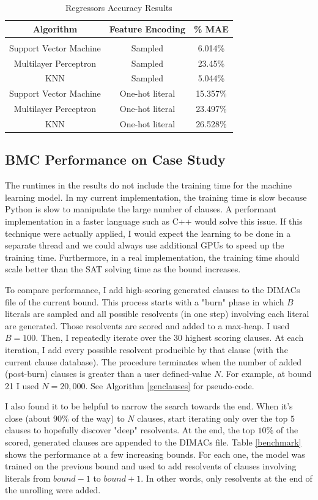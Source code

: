 \documentclass[letterpaper]{article} %
\begin{document}
\begin{table}[h!]
\centering
\begin{tabular}{ c | c | c }
Algorithm & Feature Encoding & \% MAE \\
\hline \\
Support Vector Machine & Sampled & 6.014\% \\
Multilayer Perceptron & Sampled & 23.45\% \\
KNN & Sampled & 5.044\% \\ 
Support Vector Machine & One-hot literal & 15.357\% \\
Multilayer Perceptron & One-hot literal & 23.497\% \\
KNN & One-hot literal & 26.528\% 
\end{tabular}
\caption{Regressors Accuracy Results}
\label{acc-reg}
\end{table}

\subsection{BMC Performance on Case Study}

The runtimes in the results do not include the training time for the machine learning model. In my current implementation, the training time is slow because Python is slow to manipulate the large number of clauses. A performant implementation in a faster language such as C++ would solve this issue. If this technique were actually applied, I would expect the learning to be done in a separate thread and we could always use additional GPUs to speed up the training time. Furthermore, in a real implementation, the training time should scale better than the SAT solving time as the bound increases.

To compare performance, I add high-scoring generated clauses to the DIMACs file of the current bound. This process starts with a "burn" phase in which $B$ literals are sampled and all possible resolvents (in one step) involving each literal are generated. Those resolvents are scored and added to a max-heap. I used $B=100$. Then, I repeatedly iterate over the $30$ highest scoring clauses. At each iteration, I add every possible resolvent producible by that clause (with the current clause database). The procedure terminates when the number of added (post-burn) clauses is greater than a user defined-value $N$. For example, at bound 21 I used $N=20,000$. See Algorithm \ref{genclauses} for pseudo-code.

I also found it to be helpful to narrow the search towards the end. When it's close (about 90\% of the way) to $N$ clauses, start iterating only over the top $5$ clauses to hopefully discover "deep" resolvents. At the end, the top $10\%$ of the scored, generated clauses are appended to the DIMACs file. Table \ref{benchmark} shows the performance at a few increasing bounds. For each one, the model was trained on the previous bound and used to add resolvents of clauses involving literals from $bound-1$ to $bound+1$. In other words, only resolvents at the end of the unrolling were added.
\end{document}
